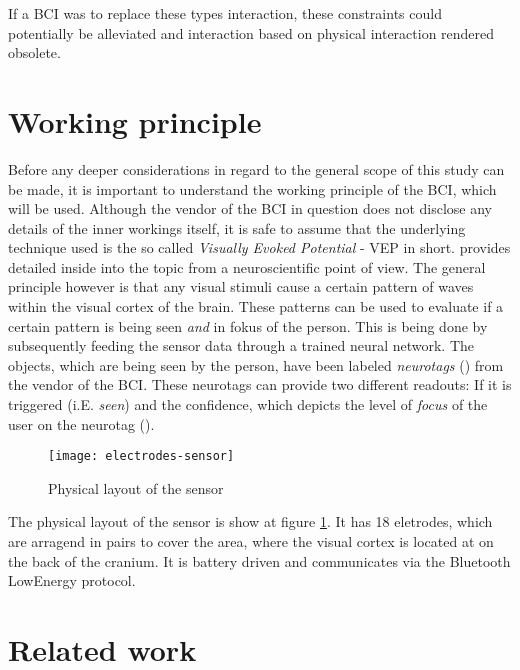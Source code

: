             If a BCI was to replace these types interaction, these constraints could potentially be alleviated and interaction based on physical interaction rendered obsolete. 

        \section{Working principle}            

            Before any deeper considerations in regard to the general scope of this study can be made, it is important to understand the working principle of the BCI, which will be used. Although the vendor of the BCI in question does not disclose any details of the inner workings itself, it is safe to assume that the underlying technique used is the so called \textit{Visually Evoked Potential} - VEP in short. \cite{Sokol.1976} provides detailed inside into the topic from a neuroscientific point of view. The general principle however is that any visual stimuli cause a certain pattern of waves within the visual cortex of the brain. These patterns can be used to evaluate if a certain pattern is being seen \textit{and} in fokus of the person. This is being done by subsequently feeding the sensor data through a trained neural network. The objects, which are being seen by the person, have been labeled \textit{neurotags} (\cite{NextMind.23112020}) from the vendor of the BCI. These neurotags can provide two different readouts: If it is triggered (i.E. \textit{seen}) and the confidence, which depicts the level of \textit{focus} of the user on the neurotag (\cite{NextMind.18112020}).
            
            \begin{figure}[h]     %
                \centering
                \texttt{[image: electrodes-sensor]} 
                \caption{Physical layout of the sensor}\label{electrodes-sensor}
            \end{figure}
            
            The physical layout of the sensor is show at figure \ref*{electrodes-sensor}. It has 18 eletrodes, which are arragend in pairs to cover the area, where the visual cortex is located at on the back of the cranium. It is battery driven and communicates via the Bluetooth LowEnergy protocol.

        \section{Related work}

